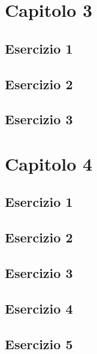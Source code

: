 \documentclass[a4paper,12pt,oneside]{book}
\begin{document}
\hypertarget{capitolo-3}{%
\section{Capitolo 3}\label{capitolo-3}}

\hypertarget{esercizio-1-1}{%
\subsection{Esercizio 1}\label{esercizio-1-1}}

\hypertarget{esercizio-2}{%
\subsection{Esercizio 2}\label{esercizio-2}}

\hypertarget{esercizio-3}{%
\subsection{Esercizio 3}\label{esercizio-3}}

\hypertarget{capitolo-4}{%
\section{Capitolo 4}\label{capitolo-4}}

\hypertarget{esercizio-1-2}{%
\subsection{Esercizio 1}\label{esercizio-1-2}}

\hypertarget{esercizio-2-1}{%
\subsection{Esercizio 2}\label{esercizio-2-1}}

\hypertarget{esercizio-3-1}{%
\subsection{Esercizio 3}\label{esercizio-3-1}}

\hypertarget{esercizio-4}{%
\subsection{Esercizio 4}\label{esercizio-4}}

\hypertarget{esercizio-5}{%
\subsection{Esercizio 5}\label{esercizio-5}}
\end{document}
